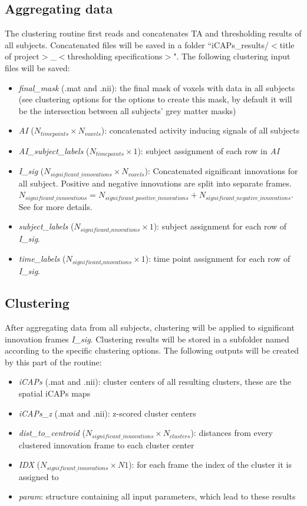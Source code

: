 \documentclass{article}
\begin{document}
\subsection{Aggregating data}
The clustering routine first reads and concatenates TA and thresholding results of all subjects. Concatenated files will be saved in a folder ``iCAPs\_results/$<$title of project$>$\_$<$thresholding specifications$>$". The following clustering input files will be saved:
\begin{itemize}
\item \textit{final\_mask} (.mat and .nii): the final mask of voxels with data in all subjects (see clustering options for the options to create this mask, by default it will be the intersection between all subjects' grey matter masks)
\item \textit{AI} ($N_{timepoints} \times N_{voxels}$): concatenated activity inducing signals of all subjects
\item \textit{AI\_subject\_labels} ($N_{timepoints} \times 1$): subject assignment of each row in \textit{AI}
\item \textit{I\_sig} ($N_{significant\_innovations} \times N_{voxels}$): Concatenated significant innovations for all subject. Positive and negative innovations are split into separate frames. $N_{significant\_innovations}=N_{significant\_positive\_innovations} + N_{significant\_negative\_innovations}$. See \cite{Karahanoglu2015} for more details.
\item \textit{subject\_labels} ($N_{significant_innovations} \times 1$): subject assignment for each row of \textit{I\_sig}.
\item \textit{time\_labels} ($N_{significant_innovations} \times 1$): time point assignment for each row of \textit{I\_sig}.
\end{itemize}

\subsection{Clustering}
After aggregating data from all subjects, clustering will be applied to significant innovation frames \textit{I\_sig}. Clustering results will be stored in a subfolder named according to the specific clustering options. The following outputs will be created by this part of the routine:
\begin{itemize}
\item \textit{iCAPs} (.mat and .nii): cluster centers of all resulting clusters, these are the spatial iCAPs maps
\item \textit{iCAPs\_z} (.mat and .nii): z-scored cluster centers
\item \textit{dist\_to\_centroid} ($N_{significant\_innovations} \times N_{clusters}$): distances from every clustered innovation frame to each cluster center
\item \textit{IDX}  ($N_{significant\_innovations} \times N1$): for each frame the index of the cluster it is assigned to
\item \textit{param}: structure containing all input parameters, which lead to these results
\end{itemize}
\end{document}
